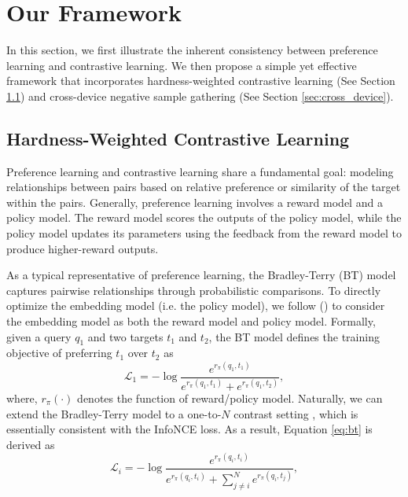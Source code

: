 \documentclass[11pt]{article}
\begin{document}
\section{Our Framework}
In this section, we first illustrate the inherent consistency between preference learning and contrastive learning. We then propose a simple yet
effective framework that incorporates hardness-weighted contrastive learning (See Section \ref{sec:hardness_weighted}) and cross-device negative sample gathering (See Section \ref{sec:cross_device}).

\subsection{Hardness-Weighted Contrastive Learning}
\label{sec:hardness_weighted}
Preference learning and contrastive learning share a fundamental goal: modeling relationships between pairs based on relative preference or similarity of the target within the pairs. Generally, preference learning involves a reward model and a policy model. The reward model scores the outputs of the policy model, while the policy model updates its parameters using the feedback from the reward model to produce higher-reward outputs. 

As a typical representative of preference learning, the Bradley-Terry (BT) model \cite{bradley1952rank} captures pairwise relationships through probabilistic comparisons. To directly optimize the embedding model (i.e. the policy model), we follow \citeauthor{DBLP:conf/aaai/00010LYHLW24} (\citeyear{DBLP:conf/aaai/00010LYHLW24}) to consider the embedding model as both the reward model and policy model. Formally, given a query $q_1$ and two targets $t_1$ and $t_2$, the BT model defines the training objective of preferring $t_1$ over $t_2$ as
\begin{equation}
    \mathcal{L}_1 = -\log\frac{e^{{r_{\pi}(q_1,t_1)}}}{e^{{r_{\pi}(q_1,t_1)}}+e^{{{r_{\pi}(q_1,t_2)}}}},
    \label{eq:bt}
\end{equation}
where, $r_{\pi}(\cdot)$ denotes the function of reward/policy model. Naturally, we can extend the Bradley-Terry \cite{bradley1952rank} model to a one-to-$N$ contrast setting \cite{DBLP:conf/aaai/00010LYHLW24}, which is essentially consistent with the InfoNCE loss. As a result, Equation \ref{eq:bt} is derived as
\begin{equation}
    \mathcal{L}_i = -\log\frac{e^{{r_{\pi}(q_i,t_i)}}}{e^{{r_{\pi}(q_i,t_i)}}+\sum_{j\neq i}^{N}e^{{{r_{\pi}(q_i,t_j)}}}},
\end{equation}
\end{document}

